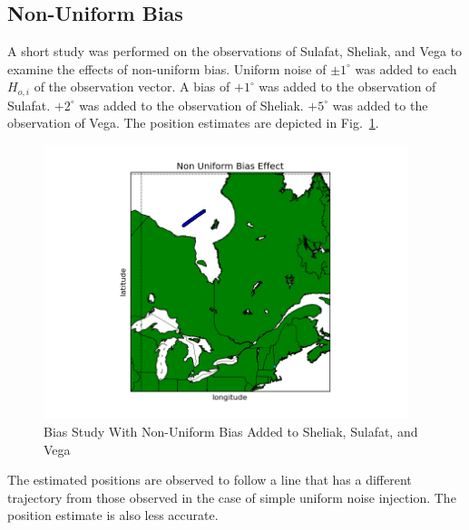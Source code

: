 \documentclass[12pt,a4paper]{book}
\begin{document}
\subsection*{Non-Uniform Bias}
A short study was performed on the observations of Sulafat, Sheliak, and Vega to examine the effects of non-uniform bias.  Uniform noise of $\pm 1^{\circ}$ was added to each $H_{o,i}$ of the observation vector.  A bias of $+1^{\circ}$ was added to the observation of Sulafat. $+2^{\circ}$ was added to the observation of Sheliak.  $+5^{\circ}$ was added to the observation of Vega. The position estimates are depicted in Fig.~\ref{f:nonUniformBias}.
\FloatBarrier
\begin{figure}[!htb]
\centering
\includegraphics[height=8cm]{nonUniformBias.png}
\caption{Bias Study With Non-Uniform Bias Added to Sheliak, Sulafat, and Vega}
\label{f:nonUniformBias}
\end{figure}
\FloatBarrier
The estimated positions are observed to follow a line that has a different trajectory from those observed in the case of simple uniform noise injection. The position estimate is also less accurate.
\end{document}
